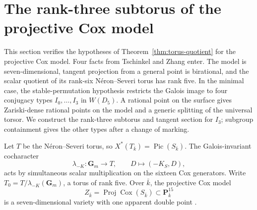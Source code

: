 \documentclass[11pt]{article}
\theoremstyle{remark}
\newcommand{\Gm}{\mathbf G_m}
\newcommand{\PP}{\mathbf P}
\newcommand{\Pic}{\operatorname{Pic}}
\begin{document}
\section{The rank-three subtorus of the projective Cox model}

This section verifies the hypotheses of Theorem~\ref{thm:torus-quotient} for
the projective Cox model.  Four facts from Tschinkel and Zhang enter.  The
model is seven-dimensional, tangent projection from a general point is
birational, and the scalar quotient of its rank-six N\'eron--Severi torus has
rank five.  In the
minimal case, the stable-permutation hypothesis restricts the Galois image to
four conjugacy types \(I_0,\ldots,I_3\) in \(W(D_5)\).  A rational point on
the surface gives Zariski-dense rational points on the model and a generic
splitting of the universal torsor.  We construct the rank-three subtorus and
tangent section for \(I_3\); subgroup containment gives the other types after
a change of marking.

Let \(T\) be the N\'eron--Severi torus, so
\(X^*(T_{\bar k})=\Pic(S_{\bar k})\).  The Galois-invariant cocharacter
\begin{equation}
 \lambda_{-K}:\Gm\longrightarrow T,
 \qquad D\longmapsto(-K_S,D),
 \label{eq:anticanonical-cocharacter}
\end{equation}
acts by simultaneous scalar multiplication on the sixteen Cox generators.
Write \(T_0=T/\lambda_{-K}(\Gm)\), a torus of rank five.  Over \(\bar k\),
the projective Cox model
\[
 Z_{\bar k}=\operatorname{Proj}\operatorname{Cox}(S_{\bar k})\subset\PP^{15}_{\bar k}
\]
is a seven-dimensional variety with one apparent double point
\cite[Lemma~3.2]{TZ}.
\end{document}
